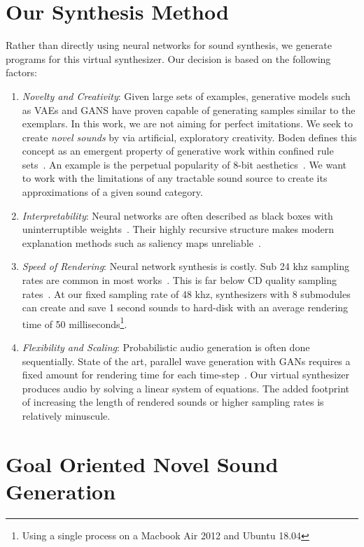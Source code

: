 \documentclass[\main/thesis.tex]{subfiles}
\begin{document}
\section{Our Synthesis Method}
 Rather than directly using neural networks for sound synthesis, we generate programs for this virtual synthesizer. Our decision is based on the following factors:
\begin{enumerate}[label=(\roman*)]
    \item \textit{Novelty and Creativity}: Given large sets of examples, generative models such as VAEs and GANS have proven capable of generating samples similar to the exemplars. In this work, we are not aiming for perfect imitations. We seek to create \emph{novel sounds} by via artificial, exploratory creativity. Boden defines this concept as an emergent property of generative work within confined rule sets~\cite{boden2009computer}. An example is the perpetual popularity of 8-bit aesthetics~\cite{collins2007loop}. We want to work with the limitations of any tractable sound source to create its approximations of a given sound category. 
    \item \textit{Interpretability}: Neural networks are often described as black boxes with uninterruptible weights~\cite{basheer2000artificial}. Their highly recursive structure makes modern explanation methods such as saliency maps unreliable~\cite{rudin2019stop}.  
    \item \textit{Speed of Rendering}: Neural network synthesis is costly. Sub 24 khz sampling rates are common in most works~\cite{yamamoto2020parallel,oord2017parallel,aouameur2019neural,ramires2020neural}. This is far below CD quality sampling rates~\cite{reiss2016meta}. At our fixed sampling rate of 48 khz, synthesizers with 8 submodules can create and save 1 second sounds to hard-disk with an average rendering time of 50 milliseconds\footnote{Using a single process on a Macbook Air 2012 and Ubuntu 18.04}. 
    \item \textit{Flexibility and Scaling}: Probabilistic audio generation is often done sequentially. State of the art, parallel wave generation with GANs requires a fixed amount for rendering time for each time-step~\cite{yamamoto2020parallel}. Our virtual synthesizer produces audio by solving a linear system of equations. The added footprint of increasing the length of rendered sounds or higher sampling rates is relatively minuscule.  
\end{enumerate}

\section{Goal Oriented Novel Sound Generation}
\end{document}
